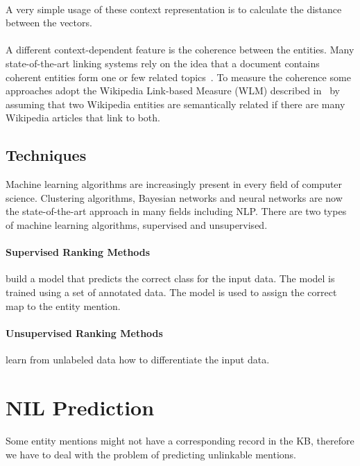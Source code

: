 \paragraph{} A very simple usage of these context representation is to calculate the distance between the vectors.

\paragraph{} A different context-dependent feature is the coherence between the entities. Many state-of-the-art linking systems rely on the idea that a document contains coherent entities form one or few related topics~\cite{hoffart2011robust}. To measure the coherence some approaches adopt the Wikipedia Link-based Measure (WLM) described in~\cite{milne2008learning} by assuming that two Wikipedia entities are semantically related if there are many Wikipedia articles that link to both.

\subsection{Techniques}
Machine learning algorithms are increasingly present in every field of computer science. Clustering algorithms, Bayesian networks and neural networks are now the state-of-the-art approach in many fields including NLP. There are two types of machine learning algorithms, supervised and unsupervised.

\paragraph{Supervised Ranking Methods} build a model that predicts the correct class for the input data. The model is trained using a set of annotated data. The model is used to assign the correct map to the entity mention.

\paragraph{Unsupervised Ranking Methods} learn from unlabeled data how to differentiate the input data. 

\section{NIL Prediction}
\paragraph{}
Some entity mentions might not have a corresponding record in the KB, therefore we have to deal with the problem of predicting unlinkable mentions.